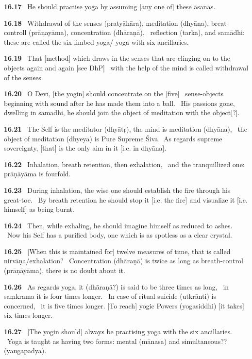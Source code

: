 \documentclass{article}
\begin{document}
\textbf{16.17}%
\ He should practise yoga by assuming [any one of] these āsanas.%


\textbf{16.18}%
\ Withdrawal of the senses (pratyāhāra), meditation (dhyāna), breat-controll (prāṇayāma), concentration (dhāraṇā),%
\ reflection (tarka), and samādhi: these are called the six-limbed yoga/ yoga with six ancillaries.%


\textbf{16.19}%
\ That [method] which draws in the senses that are clinging on to the objects again and again [see DhP]%
\ with the help of the mind is called withdrawal of the senses.%


\textbf{16.20}%
\ O Devī, [the yogin] should concentrate on the [five]%
\                 sense-objects beginning with sound after he has made them into a ball.%
\ His passions gone, dwelling in samādhi, he should join the object of meditation with the object[?].%


\textbf{16.21}%
\ The Self is the meditator (dhyātṛ), the mind is meditation (dhyāna),%
\                         the object of meditation (dhyeya) is Pure Supreme Śiva%
\ As regards supreme sovereignty, [that] is the only aim in it [i.e. in dhyāna].%


\textbf{16.22}%
\ Inhalation, breath retention, then exhalation,%
\                  and the tranquillized one: prāṇāyāma is fourfold.%


\textbf{16.23}%
\ During inhalation, the wise one should establish the fire through his great-toe.%
\                  By breath retention he should stop it [i.e. the fire] and visualize it [i.e. himself] as being burnt.%


\textbf{16.24}%
\ Then, while exhaling, he should imagine himself as reduced to ashes.%
\                  Now his Self has a purified body, one which is as spotless as a clear crystal.%


\textbf{16.25}%
\ [When this is maintained for] twelve measures of time, that is called nirvāṇa/exhalation?%
\                   Concentration (dhāraṇā) is twice as long as breath-control (prāṇāyāma), there is no doubt about it.%


\textbf{16.26}%
\ As regards yoga, it (dhāraṇā?) is said to be three times as long,%
\              in saṃkrama it is four times longer.%
\              In case of ritual suicide (utkrānti) is concerned,%
\              it is five times longer. [To reach] yogic Powers (yogasiddhi) [it takes] six times longer.%


\textbf{16.27}%
\ [The yogin should] always be practising yoga with the six ancillaries.%
\                   Yoga is taught as having two forms: mental (mānasa) and simultaneous?? (yaugapadya).%
\end{document}
